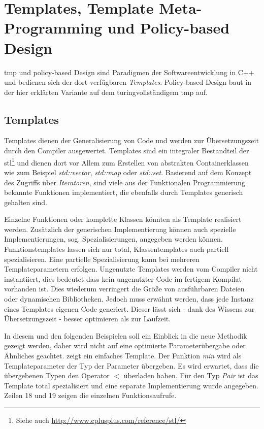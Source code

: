 \section{Templates, Template Meta-Programming und Policy-based Design}
\label{chap:impl_tmp}
\acf{tmp} und policy-based Design \cite{Alexandrescu2001Modern} sind Paradigmen der Softwareentwicklung in C++ und bedienen sich der dort verfügbaren \emph{Templates}. Policy-based Design baut in der hier erklärten Variante auf dem turingvollständigem \ac{tmp} auf.

\subsection{Templates}
Templates dienen der Generalisierung von Code und werden zur Übersetzungszeit durch den Compiler ausgewertet. Templates sind ein integraler Bestandteil der \ac{stl}\footnote{Siehe auch \url{http://www.cplusplus.com/reference/stl/}} und dienen dort vor Allem zum Erstellen von abstrakten Containerklassen wie zum Beispiel \emph{std::vector}, \emph{std::map} oder \emph{std::set}. Basierend auf dem Konzept des Zugriffs über \emph{Iteratoren}, sind viele aus der Funktionalen Programmierung bekannte Funktionen implementiert, die ebenfalls durch Templates generisch gehalten sind.

Einzelne Funktionen oder komplette Klassen könnten als Template realisiert werden. Zusätzlich der generischen Implementierung können auch spezielle Implementierungen, sog. Spezialisierungen, angegeben werden können. Funktionstemplates lassen sich nur total, Klassentemplates auch partiell spezialisieren. Eine partielle Spezialisierung kann bei mehreren Templateparametern erfolgen. Ungenutzte Templates werden vom Compiler nicht instantiiert, dies bedeutet dass kein ungenutzter Code im fertigem Kompilat vorhanden ist. Dies wiederum verringert die Größe von ausführbaren Dateien oder dynamischen Bibliotheken. Jedoch muss erwähnt werden, dass jede Instanz eines Templates eigenen Code generiert. Dieser lässt sich - dank des Wissens zur Übersetzungszeit - besser optimieren als zur Laufzeit.

In diesem und den folgenden Beispielen soll ein Einblick in die neue Methodik gezeigt werden, daher wird nicht auf eine optimierte Parameterübergabe oder Ähnliches geachtet.  zeigt ein einfaches Template. Der Funktion \emph{min} wird als Templateparameter der Typ der Parameter übergeben. Es wird erwartet, dass die übergebenen Typen den Operator $<$ überladen haben. Für den Typ \emph{Pair} ist das Template total spezialisiert und eine separate Implementierung wurde angegeben. Zeilen 18 und 19 zeigen die einzelnen Funktionsaufrufe.

